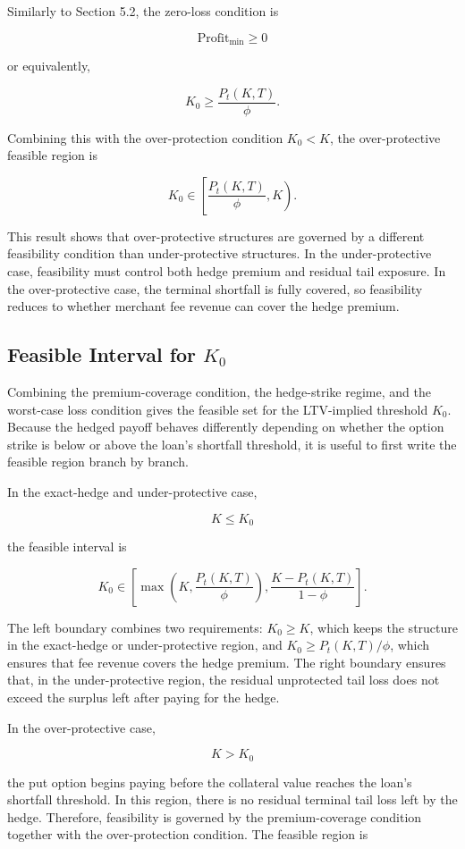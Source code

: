 \documentclass[11pt]{article}
\begin{document}
Similarly to Section 5.2, the zero-loss condition is

$$
\text{Profit}_{\min} \geq 0
$$

or equivalently,

$$
K_0 \geq \frac{P_t(K,T)}{\phi}.
$$

Combining this with the over-protection condition $K_0<K$, the over-protective feasible region is

$$
K_0 \in \left[   \frac{P_t(K,T)}{\phi}, K \right).
$$

This result shows that over-protective structures are governed by a different feasibility condition than under-protective structures. In the under-protective case, feasibility must control both hedge premium and residual tail exposure. In the over-protective case, the terminal shortfall is fully covered, so feasibility reduces to whether merchant fee revenue can cover the hedge premium.

\subsection{Feasible Interval for $K_0$}

Combining the premium-coverage condition, the hedge-strike regime, and the worst-case loss condition gives the feasible set for the LTV-implied threshold $K_0$. Because the hedged payoff behaves differently depending on whether the option strike is below or above the loan’s shortfall threshold, it is useful to first write the feasible region branch by branch.

In the exact-hedge and under-protective case,

$$
K\leq K_0
$$

the feasible interval is

$$
K_0 \in \left[ 
\max\left(K, \frac{P_t(K,T)}{\phi} \right),
\frac{K - P_t(K,T)}{1 - \phi}
 \right].
$$

The left boundary combines two requirements: $K_0\geq K$, which keeps the structure in the exact-hedge or under-protective region, and $K_0\geq P_t(K,T)/\phi$, which ensures that fee revenue covers the hedge premium. The right boundary ensures that, in the under-protective region, the residual unprotected tail loss does not exceed the surplus left after paying for the hedge.

In the over-protective case,

$$
K > K_0
$$

the put option begins paying before the collateral value reaches the loan’s shortfall threshold. In this region, there is no residual terminal tail loss left by the hedge. Therefore, feasibility is governed by the premium-coverage condition together with the over-protection condition. The feasible region is
\end{document}

